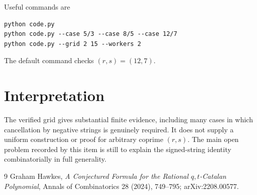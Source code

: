 \documentclass{article}
\begin{document}
Useful commands are
\begin{verbatim}
python code.py
python code.py --case 5/3 --case 8/5 --case 12/7
python code.py --grid 2 15 --workers 2
\end{verbatim}
The default command checks \((r,s)=(12,7)\).

\section{Interpretation}

The verified grid gives substantial finite evidence, including many cases in
which cancellation by negative strings is genuinely required.  It does not
supply a uniform construction or proof for arbitrary coprime \((r,s)\).  The
main open problem recorded by this item is still to explain the signed-string
identity combinatorially in full generality.

\begin{thebibliography}{9}
Graham Hawkes,
\emph{A Conjectured Formula for the Rational \(q,t\)-Catalan Polynomial},
Annals of Combinatorics 28 (2024), 749--795;
arXiv:2208.00577.
\end{thebibliography}
\end{document}
